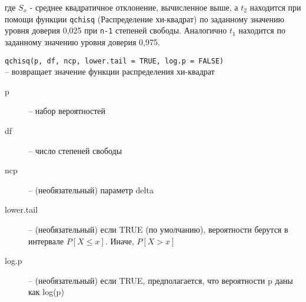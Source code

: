 \begin{enumerate}
          где $ S_x $ - среднее квадратичное отклонение, вычисленное выше, а $ t_2 $ находится при помощи
          функции \texttt{qchisq} (Распределение хи-квадрат) по заданному значению уровня доверия 0,025 при \texttt{n-1} степеней свободы.
          Аналогично $ t_1 $ находится по заданному значению уровня доверия 0,975.

          \begin{mdframed}[style=BadassFrame]

              \texttt{qchisq(p, df, ncp, lower.tail = TRUE, log.p = FALSE)} \\ -- возвращает значение функции распределения хи-квадрат
              \begin{description}

                \item[p] -- набор вероятностей
                \item[df] -- число степеней свободы
                \item[ncp] -- (необязательный) параметр delta
                \item[lower.tail] -- (необязательный) если TRUE (по умолчанию), вероятности берутся в интервале $P[X \leq x]$. Иначе, $P[X > x]$ 
                \item[log.p] -- (необязательный) если TRUE, предполагается, что вероятности p даны как log(p)
              \end{description}
        \end{mdframed}


\end{enumerate}



